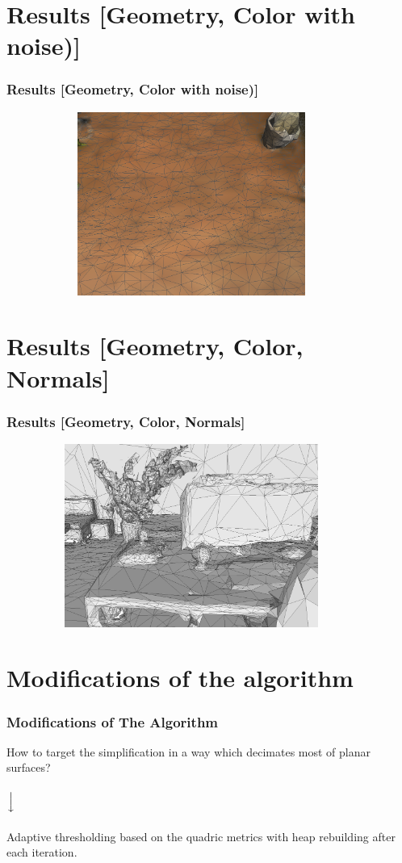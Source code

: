 \documentclass[
	10pt,
	t		%
]{beamer}
\begin{document}
\section{Results [Geometry, Color with noise)]}
\begin{frame}
\frametitle{Results [Geometry, Color with noise)]}
\centering
\begin{figure}[ht]
\centering
\includegraphics[width=10cm,height=6cm]{nosiy_floor}
\end{figure}
\end{frame}

\section{Results [Geometry, Color, Normals]}
\begin{frame}
\frametitle{Results [Geometry, Color, Normals]}
\centering
\begin{figure}[ht]
\centering
\includegraphics[width=10cm,height=6cm]{desk}
\end{figure}
\end{frame}

\section{Modifications of the algorithm}
\begin{frame}
\frametitle{Modifications of The Algorithm}
\centering
How to target the simplification in a way which decimates most of planar surfaces?\\~\\
$\Big\downarrow$\\~\\
Adaptive thresholding based on the quadric metrics with heap rebuilding after each iteration.
\end{frame}
\end{document}

